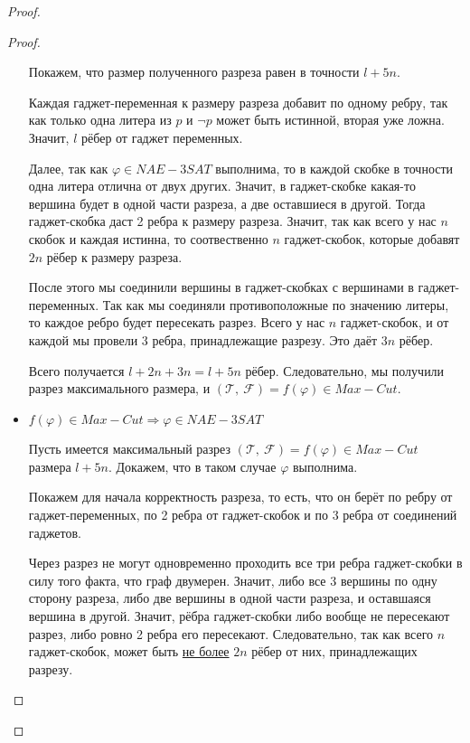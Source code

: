\documentclass[a4paper,12pt]{article}
\begin{document}
\begin{proof}
\begin{proof}
\begin{itemize}
\begin{center}
            \end{center}
            Покажем, что размер полученного разреза равен в точности $l + 5n$.
            
            Каждая гаджет-переменная к размеру разреза добавит по одному ребру, так как только одна литера из $p$ и $\neg p$ может быть истинной, вторая уже ложна. Значит, $l$ рёбер от гаджет переменных.
        
            Далее, так как $\varphi \in NAE-3SAT$ выполнима, то в каждой скобке в точности одна литера отлична от двух других. Значит, в гаджет-скобке какая-то вершина будет в одной части разреза, а две оставшиеся в другой. Тогда гаджет-скобка даст 2 ребра к размеру разреза. Значит, так как всего у нас $n$ скобок и каждая истинна, то соотвественно $n$ гаджет-скобок, которые добавят $2n$ рёбер к размеру разреза.
        
            После этого мы соединили вершины в гаджет-скобках с вершинами в гаджет-переменных. Так как мы соединяли противоположные по значению литеры, то каждое ребро будет пересекать разрез. Всего у нас $n$ гаджет-скобок, и от каждой мы провели 3 ребра, принадлежащие разрезу. Это даёт $3n$ рёбер.
        
            Всего получается $l + 2n + 3n = l + 5n$ рёбер. Следовательно, мы получили разрез максимального размера, и $(\mathcal{T},\ \mathcal{F}) = f(\varphi) \in Max-Cut$.
            
            \item $f(\varphi) \in Max-Cut \Longrightarrow \varphi \in NAE-3SAT$
            
            Пусть имеется максимальный разрез $(\mathcal{T},\ \mathcal{F}) = f(\varphi) \in Max-Cut$ размера $l + 5n$. Докажем, что в таком случае $\varphi$ выполнима.
            
            Покажем для начала корректность разреза, то есть, что он берёт по ребру от гаджет-переменных, по 2 ребра от гаджет-скобок и по 3 ребра от соединений гаджетов.
            
            Через разрез не могут одновременно проходить все три ребра гаджет-скобки в силу того факта, что граф двумерен. Значит, либо все 3 вершины по одну сторону разреза, либо две вершины в одной части разреза, и оставшаяся вершина в другой. Значит, рёбра гаджет-скобки либо вообще не пересекают разрез, либо ровно 2 ребра его пересекают. Следовательно, так как всего $n$ гаджет-скобок, может быть \underline{не более} $2n$ рёбер от них, принадлежащих разрезу.
            

\end{itemize}
\end{proof}
\end{proof}
\end{document}
